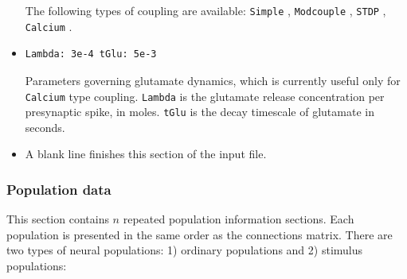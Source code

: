 \documentclass[12pt,a4paper]{article}
\newcommand{\type}[1]{ {\small\small\tt #1} }
\begin{document}
\begin{itemize}
The following types of coupling are available: \type{Simple}, \type{Modcouple}, \type{STDP}, \type{Calcium}.
\item
\begin{lstlisting}
Lambda: 3e-4 tGlu: 5e-3
\end{lstlisting}
Parameters governing glutamate dynamics, which is currently useful only for \type{Calcium} type coupling. \type{Lambda} is the glutamate release concentration per presynaptic spike, in moles. \type{tGlu} is the decay timescale of glutamate in seconds.
\item A blank line finishes this section of the input file.
\end{itemize}

\subsubsection{Population data}
\label{sec:pop}
This section contains $n$ repeated population information sections.
Each population is presented in the same order as the connections matrix.
There are two types of neural populations: 1) ordinary populations
and 2) stimulus populations:
\end{document}
